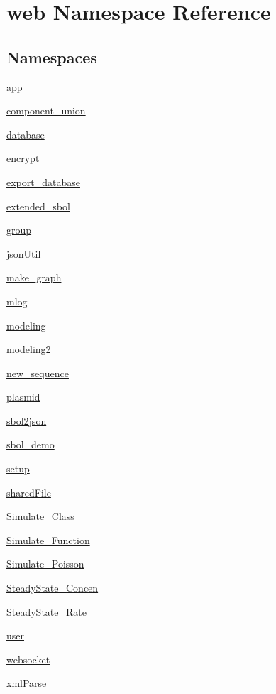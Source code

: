 \hypertarget{namespaceweb}{\section{web Namespace Reference}
\label{namespaceweb}
}
\subsection*{Namespaces}
\begin{DoxyCompactItemize}
\item 
\hyperlink{namespaceweb_1_1app}{app}
\item 
\hyperlink{namespaceweb_1_1component__union}{component\-\_\-union}
\item 
\hyperlink{namespaceweb_1_1database}{database}
\item 
\hyperlink{namespaceweb_1_1encrypt}{encrypt}
\item 
\hyperlink{namespaceweb_1_1export__database}{export\-\_\-database}
\item 
\hyperlink{namespaceweb_1_1extended__sbol}{extended\-\_\-sbol}
\item 
\hyperlink{namespaceweb_1_1group}{group}
\item 
\hyperlink{namespaceweb_1_1json_util}{json\-Util}
\item 
\hyperlink{namespaceweb_1_1make__graph}{make\-\_\-graph}
\item 
\hyperlink{namespaceweb_1_1mlog}{mlog}
\item 
\hyperlink{namespaceweb_1_1modeling}{modeling}
\item 
\hyperlink{namespaceweb_1_1modeling2}{modeling2}
\item 
\hyperlink{namespaceweb_1_1new__sequence}{new\-\_\-sequence}
\item 
\hyperlink{namespaceweb_1_1plasmid}{plasmid}
\item 
\hyperlink{namespaceweb_1_1sbol2json}{sbol2json}
\item 
\hyperlink{namespaceweb_1_1sbol__demo}{sbol\-\_\-demo}
\item 
\hyperlink{namespaceweb_1_1setup}{setup}
\item 
\hyperlink{namespaceweb_1_1shared_file}{shared\-File}
\item 
\hyperlink{namespaceweb_1_1_simulate___class}{Simulate\-\_\-\-Class}
\item 
\hyperlink{namespaceweb_1_1_simulate___function}{Simulate\-\_\-\-Function}
\item 
\hyperlink{namespaceweb_1_1_simulate___poisson}{Simulate\-\_\-\-Poisson}
\item 
\hyperlink{namespaceweb_1_1_steady_state___concen}{Steady\-State\-\_\-\-Concen}
\item 
\hyperlink{namespaceweb_1_1_steady_state___rate}{Steady\-State\-\_\-\-Rate}
\item 
\hyperlink{namespaceweb_1_1user}{user}
\item 
\hyperlink{namespaceweb_1_1websocket}{websocket}
\item 
\hyperlink{namespaceweb_1_1xml_parse}{xml\-Parse}
\end{DoxyCompactItemize}
